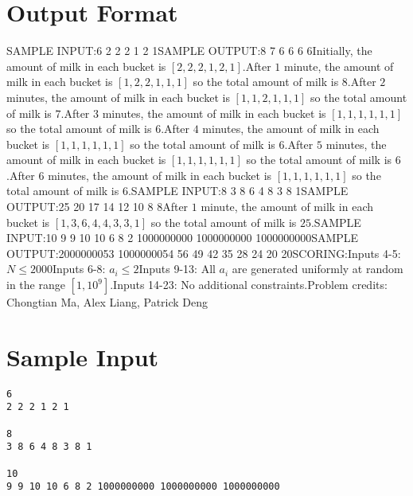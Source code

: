 \documentclass[12pt]{article}
\begin{document}
\section*{Output Format}
SAMPLE INPUT:6
2 2 2 1 2 1SAMPLE OUTPUT:8
7
6
6
6
6Initially, the amount of milk in each bucket is $[2, 2, 2, 1, 2, 1]$.After $1$ minute, the amount of milk in each bucket is $[1, 2, 2, 1, 1, 1]$
so the total amount of milk is $8$.After $2$ minutes, the amount of
milk in each bucket is $[1, 1, 2, 1, 1, 1]$ so the total amount of milk is
$7$.After $3$ minutes, the amount of milk in each bucket is
$[1, 1, 1, 1, 1, 1]$ so the total amount of milk is $6$.After $4$
minutes, the amount of milk in each bucket is  $[1, 1, 1, 1, 1, 1]$ so the total
amount of milk is $6$.After $5$ minutes, the amount of milk in each
bucket is $[1, 1, 1, 1, 1, 1]$ so the total amount of milk is $6$.After $6$ minutes, the amount of milk in each bucket is $[1, 1, 1, 1, 1, 1]$
so the total amount of milk is
$6$.SAMPLE INPUT:8
3 8 6 4 8 3 8 1SAMPLE OUTPUT:25
20
17
14
12
10
8
8After $1$ minute, the amount of milk in each bucket is
$[1, 3, 6, 4, 4, 3, 3, 1]$ so the total amount of milk is $25$.SAMPLE INPUT:10
9 9 10 10 6 8 2 1000000000 1000000000 1000000000SAMPLE OUTPUT:2000000053
1000000054
56
49
42
35
28
24
20
20SCORING:Inputs 4-5: $N \le 2000$Inputs 6-8: $a_i \le 2$Inputs
9-13: All $a_i$ are generated uniformly at random in the range $[1,10^9]$.Inputs 14-23: No additional constraints.Problem credits: Chongtian Ma, Alex Liang, Patrick Deng

\section*{Sample Input}
\begin{verbatim}
6
2 2 2 1 2 1

8
3 8 6 4 8 3 8 1

10
9 9 10 10 6 8 2 1000000000 1000000000 1000000000
\end{verbatim}
\end{document}
